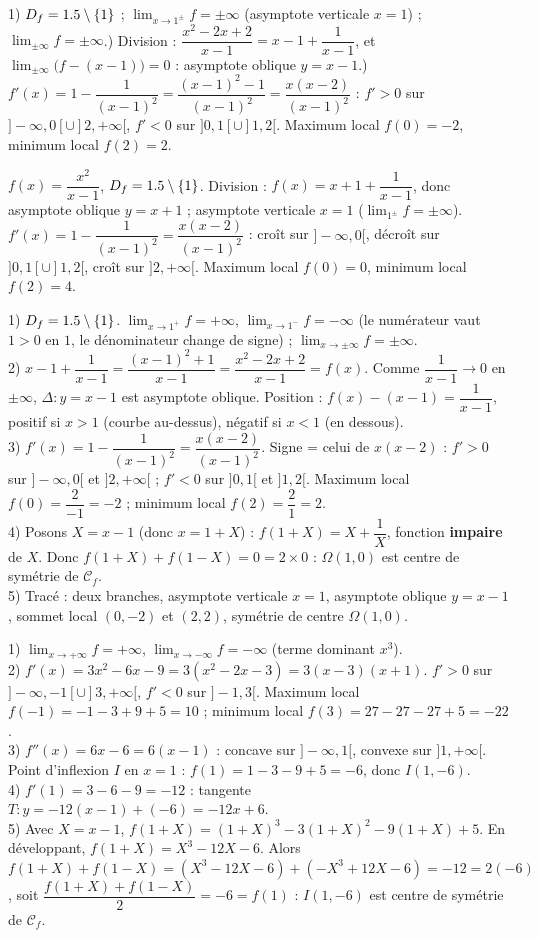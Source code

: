 1) $D_f=1.5\setminus\{1\}$ ; $\displaystyle\lim_{x\to1^{\pm}}f=\pm\infty$ (asymptote verticale $x=1$) ;
$\lim_{\pm\infty}f=\pm\infty$.) Division : $\dfrac{x^{2}-2x+2}{x-1}=x-1+\dfrac{1}{x-1}$, et $\displaystyle\lim_{\pm\infty}\big(f-(x-1)\big)=0$ :
asymptote oblique $y=x-1$.) $f'(x)=1-\dfrac1{(x-1)^{2}}=\dfrac{(x-1)^{2}-1}{(x-1)^{2}}=\dfrac{x(x-2)}{(x-1)^{2}}$ :
$f'>0$ sur $]-\infty,0[\cup]2,+\infty[$, $f'<0$ sur $]0,1[\cup]1,2[$. Maximum local $f(0)=-2$,
minimum local $f(2)=2$.

$f(x)=\dfrac{x^{2}}{x-1}$, $D_f=1.5\setminus\{1\}$. Division : $f(x)=x+1+\dfrac1{x-1}$, donc
asymptote oblique $y=x+1$ ; asymptote verticale $x=1$ ($\lim_{1^{\pm}}f=\pm\infty$).
$f'(x)=1-\dfrac1{(x-1)^{2}}=\dfrac{x(x-2)}{(x-1)^{2}}$ : croît sur $]-\infty,0[$, décroît sur
$]0,1[\cup]1,2[$, croît sur $]2,+\infty[$. Maximum local $f(0)=0$, minimum local $f(2)=4$.

1) $D_f=1.5\setminus\{1\}$. $\displaystyle\lim_{x\to1^{+}}f=+\infty$, $\lim_{x\to1^{-}}f=-\infty$
(le numérateur vaut $1>0$ en $1$, le dénominateur change de signe) ; $\lim_{x\to\pm\infty}f=\pm\infty$.\\
2) $x-1+\dfrac1{x-1}=\dfrac{(x-1)^{2}+1}{x-1}=\dfrac{x^{2}-2x+2}{x-1}=f(x)$. Comme
$\dfrac1{x-1}\to0$ en $\pm\infty$, $\Delta:y=x-1$ est asymptote oblique. Position :
$f(x)-(x-1)=\dfrac1{x-1}$, positif si $x>1$ (courbe au-dessus), négatif si $x<1$ (en dessous).\\
3) $f'(x)=1-\dfrac1{(x-1)^{2}}=\dfrac{x(x-2)}{(x-1)^{2}}$. Signe = celui de $x(x-2)$ :
$f'>0$ sur $]-\infty,0[$ et $]2,+\infty[$ ; $f'<0$ sur $]0,1[$ et $]1,2[$. Maximum local
$f(0)=\dfrac{2}{-1}=-2$ ; minimum local $f(2)=\dfrac{2}{1}=2$.\\
4) Posons $X=x-1$ (donc $x=1+X$) : $f(1+X)=X+\dfrac1X$, fonction \textbf{impaire} de $X$.
Donc $f(1+X)+f(1-X)=0=2\times0$ : $\Omega(1,0)$ est centre de symétrie de $\mathcal C_f$.\\
5) Tracé : deux branches, asymptote verticale $x=1$, asymptote oblique $y=x-1$, sommet
local $(0,-2)$ et $(2,2)$, symétrie de centre $\Omega(1,0)$.

1) $\displaystyle\lim_{x\to+\infty}f=+\infty$, $\lim_{x\to-\infty}f=-\infty$ (terme dominant $x^{3}$).\\
2) $f'(x)=3x^{2}-6x-9=3(x^{2}-2x-3)=3(x-3)(x+1)$. $f'>0$ sur $]-\infty,-1[\cup]3,+\infty[$,
$f'<0$ sur $]-1,3[$. Maximum local $f(-1)=-1-3+9+5=10$ ; minimum local
$f(3)=27-27-27+5=-22$.\\
3) $f''(x)=6x-6=6(x-1)$ : concave sur $]-\infty,1[$, convexe sur $]1,+\infty[$. Point
d'inflexion $I$ en $x=1$ : $f(1)=1-3-9+5=-6$, donc $I(1,-6)$.\\
4) $f'(1)=3-6-9=-12$ : tangente $T:y=-12(x-1)+(-6)=-12x+6$.\\
5) Avec $X=x-1$, $f(1+X)=(1+X)^{3}-3(1+X)^{2}-9(1+X)+5$. En développant,
$f(1+X)=X^{3}-12X-6$. Alors $f(1+X)+f(1-X)=(X^{3}-12X-6)+(-X^{3}+12X-6)=-12=2(-6)$,
soit $\dfrac{f(1+X)+f(1-X)}2=-6=f(1)$ : $I(1,-6)$ est centre de symétrie de $\mathcal C_f$.

